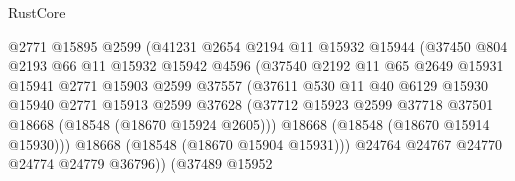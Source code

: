 \begin{lexlean}{RustCore}
\begin{coremodule}
                                @2771
                                @15895
                                @2599
                                (@41231
                                  @2654
                                  @2194
                                  @11
                                  @15932
                                  @15944
                                  (@37450
                                    @804
                                    @2193
                                    @66
                                    @11
                                    @15932
                                    @15942
                                    @4596
                                    (@37540
                                      @2192
                                      @11
                                      @65
                                      @2649
                                      @15931
                                      @15941
                                      @2771
                                      @15903
                                      @2599
                                      @37557
                                      (@37611
                                        @530
                                        @11
                                        @40
                                        @6129
                                        @15930
                                        @15940
                                        @2771
                                        @15913
                                        @2599
                                        @37628
                                        (@37712
                                          @15923
                                          @2599
                                          @37718
                                          @37501
                                          @18668
                                          (@18548 (@18670 @15924 @2605)))
                                        @18668
                                        (@18548 (@18670 @15914 @15930)))
                                      @18668
                                      (@18548 (@18670 @15904 @15931)))
                                    @24764
                                    @24767
                                    @24770
                                    @24774
                                    @24779
                                    @36796))
                                (@37489
                                  @15952

\end{coremodule}
\end{lexlean}
